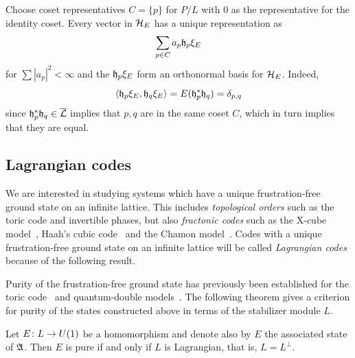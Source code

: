 \documentclass[11pt]{amsart}
\begin{document}
\begin{rem}
Choose coset representatives $C=\{p\}$ for $P/L$ with $0$ as the representative for the identity coset.
Every vector in $\mathcal{H}_E$ has a unique representation as
\[\sum_{p \in C} a_p \mathfrak{h}_p  \xi_E \]
for $\sum |a_p|^2<\infty$ and the $ \mathfrak{h}_p  \xi_E$ form an orthonormal basis for $\mathcal{H}_E$. Indeed,
\[ \langle  \mathfrak{h}_p  \xi_E,  \mathfrak{h}_q  \xi_E\rangle  = E(\mathfrak{h}_p^*\mathfrak{h}_q) = \delta_{p,q}\]
since $\mathfrak{h}_p^*\mathfrak{h}_q \in \overline{\mathcal{L}}$ implies that $p,q$ are in the same coset $C$, which in turn implies that they are equal.
\end{rem}

\subsection{Lagrangian codes}

We are interested in studying systems which have a unique frustration-free ground state on an infinite lattice. This includes \emph{topological orders} such as the toric code and invertible phases, but also \emph{fractonic codes} such as the X-cube model~\cite{vijay_haah_fu_2016}, Haah's cubic code~\cite{haah_2011} and the Chamon model~\cite{chamon_2005}. Codes with a unique frustration-free ground state on an infinite lattice will be called \emph{Lagrangian codes} because of the following result.


Purity of the frustration-free ground state has previously been established for the toric code~\cite[Section~2.2.1]{alicki_fannes_horodecki_2007}\cite[Proposition~2.2]{naaijkens_2011} and quantum-double models~\cite[Theorem~3.5]{fiedler_naaijkens_2015}. The following theorem gives a criterion for purity of the states constructed above in terms of the stabilizer module $L$.

\begin{theorem}\label{thm:topologicalorder}
Let $E\colon L \to U(1)$ be a homomorphism and denote also by $E$ the associated state of $\mathfrak{A}$. Then $E$ is pure if and only if  $L$ is Lagrangian, that is, $L=L^\perp$.
\end{theorem}
\end{document}
